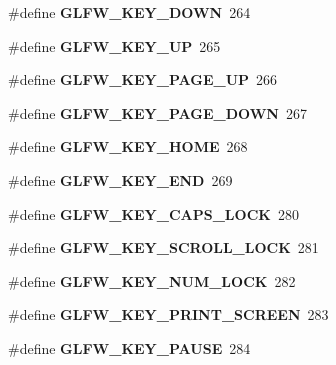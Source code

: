 \begin{DoxyCompactItemize}
\#define {\bfseries G\+L\+F\+W\+\_\+\+K\+E\+Y\+\_\+\+D\+O\+WN}~264
\item 
\mbox{\label{group__keys_ga2f3342b194020d3544c67e3506b6f144}} 
\#define {\bfseries G\+L\+F\+W\+\_\+\+K\+E\+Y\+\_\+\+UP}~265
\item 
\mbox{\label{group__keys_ga3ab731f9622f0db280178a5f3cc6d586}} 
\#define {\bfseries G\+L\+F\+W\+\_\+\+K\+E\+Y\+\_\+\+P\+A\+G\+E\+\_\+\+UP}~266
\item 
\mbox{\label{group__keys_gaee0a8fa442001cc2147812f84b59041c}} 
\#define {\bfseries G\+L\+F\+W\+\_\+\+K\+E\+Y\+\_\+\+P\+A\+G\+E\+\_\+\+D\+O\+WN}~267
\item 
\mbox{\label{group__keys_ga41452c7287195d481e43207318c126a7}} 
\#define {\bfseries G\+L\+F\+W\+\_\+\+K\+E\+Y\+\_\+\+H\+O\+ME}~268
\item 
\mbox{\label{group__keys_ga86587ea1df19a65978d3e3b8439bedd9}} 
\#define {\bfseries G\+L\+F\+W\+\_\+\+K\+E\+Y\+\_\+\+E\+ND}~269
\item 
\mbox{\label{group__keys_ga92c1d2c9d63485f3d70f94f688d48672}} 
\#define {\bfseries G\+L\+F\+W\+\_\+\+K\+E\+Y\+\_\+\+C\+A\+P\+S\+\_\+\+L\+O\+CK}~280
\item 
\mbox{\label{group__keys_gaf622b63b9537f7084c2ab649b8365630}} 
\#define {\bfseries G\+L\+F\+W\+\_\+\+K\+E\+Y\+\_\+\+S\+C\+R\+O\+L\+L\+\_\+\+L\+O\+CK}~281
\item 
\mbox{\label{group__keys_ga3946edc362aeff213b2be6304296cf43}} 
\#define {\bfseries G\+L\+F\+W\+\_\+\+K\+E\+Y\+\_\+\+N\+U\+M\+\_\+\+L\+O\+CK}~282
\item 
\mbox{\label{group__keys_gaf964c2e65e97d0cf785a5636ee8df642}} 
\#define {\bfseries G\+L\+F\+W\+\_\+\+K\+E\+Y\+\_\+\+P\+R\+I\+N\+T\+\_\+\+S\+C\+R\+E\+EN}~283
\item 
\mbox{\label{group__keys_ga8116b9692d87382afb5849b6d8907f18}} 
\#define {\bfseries G\+L\+F\+W\+\_\+\+K\+E\+Y\+\_\+\+P\+A\+U\+SE}~284
\item 
\mbox{\label{group__keys_gafb8d66c573acf22e364049477dcbea30}} 

\end{DoxyCompactItemize}
